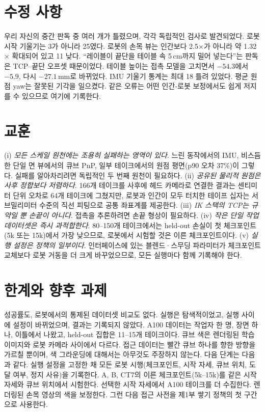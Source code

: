 \documentclass[conference,10pt]{IEEEtran}
\newcommand{\mm}{\,mm\xspace}
\begin{document}
\section{수정 사항}\label{sec:corr}
우리 자신의 중간 판독 중 여러 개가 틀렸으며, 각각 독립적인 검사로 발견되었다. 로봇 시작 기울기는 3\textdegree{}가 아니라
25\textdegree{}였다. 로봇의 손목 뷰는 인간보다 2.5$\times$가 아니라 약 1.32$\times$ 확대되어 있고 11\textdegree{} 낮다.
``레이블이 끝단을 테이블 속 5\,cm까지 밀어 넣는다''는 판독은 TCP--끝단 오프셋 때문이었다. 테이블 높이는 접촉 모델을 고치면서
$-54.3$에서 $-5.9$, 다시 $-27.1$\mm{}로 바뀌었다. IMU 기울기 통계는 최대 18\textdegree{} 틀려 있었다. 평균 원점 yaw는 잘못된
기각을 일으켰다. 같은 오류는 어떤 인간-로봇 보정에서도 쉽게 저지를 수 있으므로 여기에 기록한다.

\section{교훈}\label{sec:lessons}
(i) \emph{모든 스케일 원천에는 조용히 실패하는 영역이 있다}. 느린 동작에서의 IMU, 비스듬한 단일 면 뷰에서의 큐브 PnP,
일부 테이크에서의 원점 평면(p90 오차 37\%)이 그렇다. 실패를 알아차리려면 독립적인 두 번째 원천이 필요하다. (ii) \emph{공유된
물리적 원점은 사후 정합보다 저렴하다}. 166개 테이크를 사후에 헤드 카메라로 연결한 결과는 센티미터 단위 오차로 64개
테이크에 그쳤지만, 로봇과 인간이 모두 터치한 테이프 십자는 서브밀리미터 수준의 직선 피팅으로 공통 좌표계를 제공한다.
(iii) \emph{IK 스택의 TCP는 규약일 뿐 손끝이 아니다}. 접촉을 추론하려면 손끝 형상이 필요하다. (iv) \emph{작은 단일 작업
데이터셋은 즉시 과적합한다}. 80--150개 테이크에서는 held-out 손실이 첫 체크포인트(5k 또는 15k)에서 가장 낮으므로, 로봇에서
시험할 것은 이른 체크포인트이다. (v) \emph{실행 설정은 정책의 일부이다}. 인터페이스에 있는 블렌드·스무딩 파라미터가
체크포인트 교체보다 로봇 거동을 더 크게 바꾸었으므로, 모든 실행마다 함께 기록해야 한다.

\section{한계와 향후 과제}\label{sec:lim}
성공률도, 로봇에서의 통제된 데이터셋 비교도 없다. 실행은 탐색적이었고, 실행 사이에 설정이 바뀌었으며, 결과는 기록되지
않았다. A100 데이터는 작업자 한 명, 장면 하나, 이틀에서 나왔고, held-out 집합은 11--15개 테이크이다. 큐브 색은 렌더링된
학습 이미지와 로봇 카메라 사이에서 다르다. 접근 데이터는 빨간 큐브 하나를 향한 방향을 가르칠 뿐이며, 색 그라운딩에
대해서는 아무것도 주장하지 않는다. 다음 단계는 다음과 같다. 실행 설정을 고정한 채 모든 로봇 시행(체크포인트, 시작 자세,
큐브 위치, 도달 여부, 정지 사유)을 기록한다. A, B, CT7의 이른 체크포인트(5k--15k)를 같은 시작 자세와 큐브 위치에서
시험한다. 선택한 시작 자세에서 A100 테이크를 더 수집한다. 렌더링된 손목 영상의 색을 보정한다. 그런 다음 접근 사전을
제1부 쌓기 정책의 첫 구간으로 사용한다.
\end{document}
